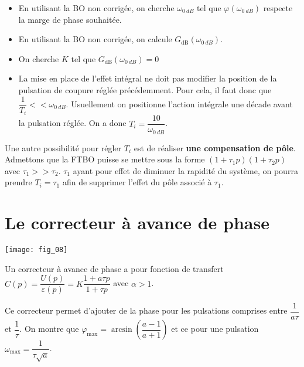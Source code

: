\begin{methode}
\begin{itemize}
\item En utilisant la BO non corrigée, on cherche $\omega_{\SI{0}{dB}}$ tel que $\varphi(\omega_{\SI{0}{dB}})$ respecte la marge de phase souhaitée. 
\item En utilisant la BO non corrigée, on calcule $G_{\text{dB}}\left(\omega_{\SI{0}{dB}}\right)$. 
\item On cherche $K$ tel que $G_{\text{dB}}\left(\omega_{\SI{0}{dB}}\right)=0$
\item La mise en place de l'effet intégral ne doit pas modifier la position de la pulsation de coupure réglée précédemment. Pour cela, il faut donc que $\dfrac{1}{T_i}<< \omega_{\SI{0}{dB}}$. Usuellement on positionne l'action intégrale une décade avant la pulsation réglée. On a donc $T_i=\dfrac{10}{\omega_{\SI{0}{dB}}}$.
\end{itemize}
\end{methode}


\begin{remarque}
Une autre possibilité pour régler $T_i$ est de réaliser \textbf{une compensation de pôle}. Admettons que la FTBO puisse se mettre sous la forme $(1+\tau_1 p)(1+\tau_2 p)$ avec $\tau_1>>\tau_2$. $\tau_1$ ayant pour effet de diminuer la rapidité du système, on pourra prendre $T_i=\tau_1$ afin de supprimer l'effet du pôle associé à $\tau_1$.
\end{remarque}


\section{Le correcteur à avance de phase}

\begin{marginfigure}
\texttt{[image: fig\_08]}
\end{marginfigure}

\begin{defi}
Un correcteur à avance de phase a pour fonction de transfert $C(p)=\dfrac{U(p)}{\varepsilon(p)}=K\dfrac{1+a\tau p}{1+\tau p}$ avec $\alpha>1$.
\end{defi}


\begin{resultat}
Ce correcteur permet d'ajouter de la phase pour les pulsations comprises entre $\dfrac{1}{a\tau}$ et $\dfrac{1}{\tau}$. On montre que $\varphi_{\text{max}} = \arcsin \left( \dfrac{a-1}{a+1}\right)$ et ce pour une pulsation $\omega_{\text{max}}=\dfrac{1}{\tau\sqrt{a}}$.
\end{resultat}

